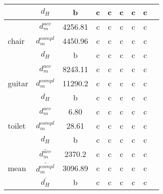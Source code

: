 \begin{center}
\begin{tabular}{| l | c | c | c | c | c | c | c | c |}
        &$d_H$&b&c&c&c&c&c&\\
        \hline
        \multirow{3}{*}{chair}&$d_m^{acc}$&4256.81&c&c&c&c&c&\\
        &$d_m^{compl}$&4450.96&c&c&c&c&c&\\
        &$d_H$&b&c&c&c&c&c&\\
        \hline
        \multirow{3}{*}{guitar}&$d_m^{acc}$&8243.11&c&c&c&c&c&\\
        &$d_m^{compl}$&11290.2&c&c&c&c&c&\\
        &$d_H$&b&c&c&c&c&c&\\
        \hline
        \multirow{3}{*}{toilet}&$d_m^{acc}$&6.80&c&c&c&c&c&\\
        &$d_m^{compl}$&28.61&c&c&c&c&c&\\
        &$d_H$&b&c&c&c&c&c&\\
        \hline\hline
        \multirow{3}{*}{mean}&$\bar{d_m^{acc}}$&2370.2&c&c&c&c&c&\\
        &$\bar{d_m^{compl}}$&3096.89&c&c&c&c&c&\\
        &$\bar{d_H}$&b&c&c&c&c&c&\\
        \hline
    \end{tabular}
\end{center}

